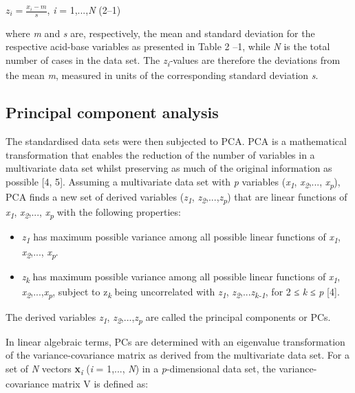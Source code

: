 \documentclass[
  12pt,
  a4paperpaper,
]{report}
\begin{document}
\(z_{i} = \frac{x_{i} - m}{s}\), \emph{i} = 1,...,\emph{N} (2--1)

where \emph{m} and \emph{s} are, respectively, the mean and standard
deviation for the respective acid-base variables as presented in Table 2
--1, while \emph{N} is the total number of cases in the data set. The
\emph{z\textsubscript{i}-}values are therefore the deviations from the
mean \emph{m}, measured in units of the corresponding standard deviation
\emph{s}.

\hypertarget{principal-component-analysis}{%
\subsection{Principal component
analysis}\label{principal-component-analysis}}

The standardised data sets were then subjected to PCA. PCA is a
mathematical transformation that enables the reduction of the number of
variables in a multivariate data set whilst preserving as much of the
original information as possible {[}4, 5{]}. Assuming a multivariate
data set with \emph{p} variables (\emph{x\textsubscript{1}},
\emph{x\textsubscript{2}},..., \emph{x\textsubscript{p}}), PCA finds a
new set of derived variables (\emph{z\textsubscript{1}},
\emph{z\textsubscript{2}},...,\emph{z\textsubscript{p}}) that are linear
functions of \emph{x\textsubscript{1}}, \emph{x\textsubscript{2}},...,
\emph{x\textsubscript{p}} with the following properties:

\begin{itemize}
\item
  \emph{z\textsubscript{1}} has maximum possible variance among all
  possible linear functions of \emph{x\textsubscript{1}},
  \emph{x\textsubscript{2}},..., \emph{x\textsubscript{p}}.
\item
  \emph{z\textsubscript{k}} has maximum possible variance among all
  possible linear functions of \emph{x\textsubscript{1}},
  \emph{x\textsubscript{2}},...,\emph{x\textsubscript{p}}, subject to
  z\emph{\textsubscript{k}} being uncorrelated with
  \emph{z\textsubscript{1}},
  \emph{z\textsubscript{2}},...\emph{z\textsubscript{k-1}}, for 2 ≤
  \emph{k} ≤ \emph{p} {[}4{]}.
\end{itemize}

The derived variables \emph{z\textsubscript{1}},
\emph{z\textsubscript{2}},...,\emph{z\textsubscript{p}} are called the
principal components or PCs.

In linear algebraic terms, PCs are determined with an eigenvalue
transformation of the variance-covariance matrix as derived from the
multivariate data set. For a set of \emph{N} vectors
\textbf{x}\emph{\textsubscript{i}} (\emph{i} = 1,..., \emph{N}) in a
\emph{p}-dimensional data set, the variance-covariance matrix V is
defined as:
\end{document}

